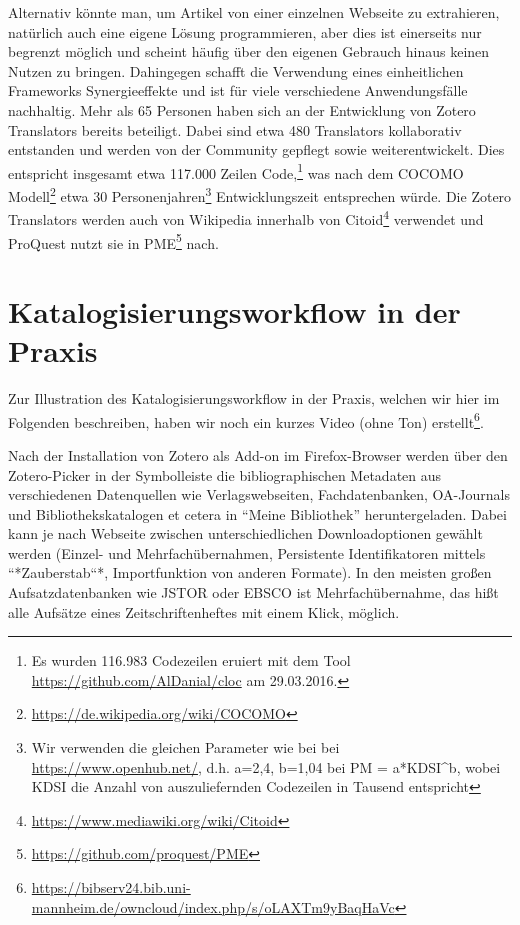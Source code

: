 \documentclass[a4paper,
fontsize=11pt,
oneside,
numbers=noperiodatend,
parskip=half-,
bibliography=totoc,
final
]{scrartcl}
\begin{document}
Alternativ könnte man, um Artikel von einer einzelnen Webseite zu
extrahieren, natürlich auch eine eigene Lösung programmieren, aber dies
ist einerseits nur begrenzt möglich und scheint häufig über den eigenen
Gebrauch hinaus keinen Nutzen zu bringen. Dahingegen schafft die
Verwendung eines einheitlichen Frameworks Synergieeffekte und ist für
viele verschiedene Anwendungsfälle nachhaltig. Mehr als 65 Personen
haben sich an der Entwicklung von Zotero Translators bereits beteiligt.
Dabei sind etwa 480 Translators kollaborativ entstanden und werden von
der Community gepflegt sowie weiterentwickelt. Dies entspricht insgesamt
etwa 117.000 Zeilen Code,\footnote{Es wurden 116.983 Codezeilen eruiert
  mit dem Tool \url{https://github.com/AlDanial/cloc} am 29.03.2016.}
was nach dem COCOMO Modell\footnote{\url{https://de.wikipedia.org/wiki/COCOMO}}
etwa 30 Personenjahren\footnote{Wir verwenden die gleichen Parameter wie
  bei bei \url{https://www.openhub.net/}, d.h. a=2,4, b=1,04 bei PM =
  a*KDSI\^{}b, wobei KDSI die Anzahl von auszuliefernden Codezeilen in
  Tausend entspricht} Entwicklungszeit entsprechen würde. Die Zotero
Translators werden auch von Wikipedia innerhalb von Citoid\footnote{\url{https://www.mediawiki.org/wiki/Citoid}}
verwendet und ProQuest nutzt sie in PME\footnote{\url{https://github.com/proquest/PME}}
nach.

\section*{Katalogisierungsworkflow in der
Praxis}\label{katalogisierungsworkflow-in-der-praxis}

Zur Illustration des Katalogisierungsworkflow in der Praxis, welchen wir
hier im Folgenden beschreiben, haben wir noch ein kurzes Video (ohne
Ton) erstellt\footnote{\url{https://bibserv24.bib.uni-mannheim.de/owncloud/index.php/s/oLAXTm9yBaqHaVc}}.

Nach der Installation von Zotero als Add-on im Firefox-Browser werden
über den Zotero-Picker in der Symbolleiste die bibliographischen
Metadaten aus verschiedenen Datenquellen wie Verlagswebseiten,
Fachdatenbanken, OA-Journals und Bibliothekskatalogen et cetera in
\enquote{Meine Bibliothek} heruntergeladen. Dabei kann je nach Webseite
zwischen unterschiedlichen Downloadoptionen gewählt werden (Einzel- und
Mehrfachübernahmen, Persistente Identifikatoren mittels
``*Zauberstab``*, Im\-portfunktion von anderen Formate). In den meisten
großen Aufsatzdatenbanken wie JSTOR oder EBSCO ist Mehrfachübernahme,
das hißt alle Aufsätze eines Zeitschriftenheftes mit einem Klick,
möglich.
\end{document}
